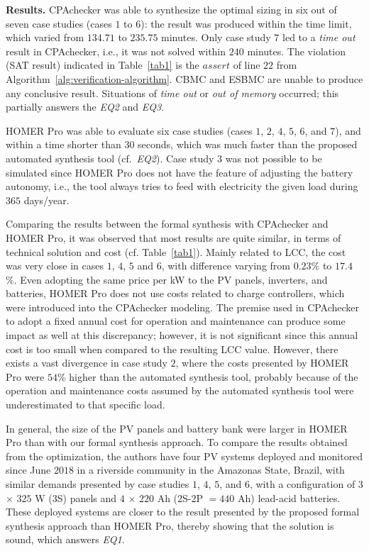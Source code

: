 \documentclass[runningheads]{llncs}
\begin{document}
\noindent \textbf{Results.} CPAchecker was able to synthesize the optimal sizing in six out of seven case studies (cases $1$ to $6$): the result was produced within the time limit, which varied from $134.71$ to $235.75$ minutes. 
Only case study $7$ led to a \textit{time out} result in CPAchecker, i.e., it was not solved within $240$ minutes.
The violation (SAT result) indicated in Table~\ref{tab1} 
is the $assert$ of line $22$ from Algorithm~\ref{alg:verification-algorithm}. CBMC and ESBMC are unable to produce any conclusive result. Situations of \textit{time out} or \textit{out of memory} occurred; this partially answers the \textit{EQ2} and \textit{EQ3}. 

HOMER Pro was able to evaluate six case studies (cases $1$, $2$, $4$, $5$, $6$, and $7$), and within a time shorter than $30$ seconds, which was much faster than the proposed automated synthesis tool (cf.~\textit{EQ2}). Case study $3$ was not possible to be simulated since HOMER Pro does not have the feature of adjusting the battery autonomy, i.e., the tool always tries to feed with electricity the given load during $365$ days/year. 

Comparing the results between the formal synthesis with CPAchecker and HOMER Pro, it was observed that most results are quite similar, in terms of technical solution and cost (cf. Table~\ref{tab1}). Mainly related to LCC, the cost was very close in cases $1$, $4$, $5$ and $6$, with difference varying from $0.23$\% to $17.4$\%. Even adopting the same price per kW to the PV panels, inverters, and batteries, HOMER Pro does not use costs related to charge controllers, which were introduced into the CPAchecker modeling. The premise used in CPAchecker to adopt a fixed annual cost for operation and maintenance can produce some impact as well at this discrepancy; however, it is not significant since this annual cost is too small when compared to the resulting LCC value. However, there exists a vast divergence in case study $2$, where the costs presented by HOMER Pro were $54$\% higher than the automated synthesis tool, probably because of the operation and maintenance costs assumed by the automated synthesis tool were underestimated to that specific load. 

In general, the size of the PV panels and battery bank were larger in HOMER Pro than with our formal synthesis approach. To compare the results obtained from the optimization, the authors have four PV systems deployed and monitored since June $2018$ in a riverside community in the Amazonas State, Brazil, with similar demands presented by case studies $1$, $4$, $5$, and $6$, with a configuration of $3$ $\times$ $325$ W ($3$S) panels and $4$ $\times$ $220$ Ah ($2$S-$2$P $= 440$ Ah) lead-acid batteries. These deployed systems are closer to the result presented by the proposed formal synthesis approach than HOMER Pro, thereby showing that the solution is sound, which answers \textit{EQ1}.
\end{document}
